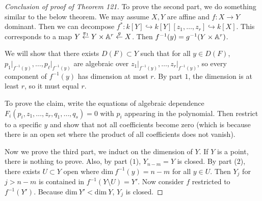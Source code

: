 \documentclass[twoside, 10pt]{article}
\begin{document}
    \begin{proof}[Conclusion of proof of Theorem 121] To prove the second part,
        we do something similar to the below theorem.  We may assume $X,Y$ are
        affine and $f:X \to Y$ dominant. Then we can decompose $f^*:k[Y]
        \hookrightarrow k[Y][z_1, \ldots, z_r] \hookrightarrow k[X]$. This
        corresponds to a map $Y \overset{\pi_1}{\gets} Y \times \mathbb{A}^r
        \overset{g}{\gets} X$. Then $f^{-1}(y) = g^{-1}(Y \times \mathbb{A}^r)$.

        We will show that there exists $D(F) \subset Y$ such that for all $y
        \in D(F)$, $p_1\vert_{f^{-1}(y)}, \ldots, p_{\ell}\vert_{f^{-1}(y)}$
        are algebraic over $z_1\vert_{f^{-1}(y)}, \ldots,
        z_r\vert_{f^{-1}(y)}$, so every component of $f^{-1}(y)$ has dimension
        at most $r$. By part $1$, the dimension is at least $r$, so it must
        equal $r$.

        To prove the claim, write the equations of algebraic dependence
        $F_i(p_i, z_1, \ldots, z_r, q_1, \ldots, q_s) = 0$ with $p_i$ appearing
        in the polynomial. Then restrict to a specific $y$ and show that not
        all coefficients become zero (which is because there is an open set
        where the product of all coefficients does not vanish).

        Now we prove the third part, we induct on the dimension of $Y$. If $Y$
        is a point, there is nothing to prove. Also, by part ($1$), $Y_{n-m} =
        Y$ is closed. By part ($2$), there exists $U \subset Y$ open where
        $\mathrm{dim}\ f^{-1}(y) = n-m$ for all $y \in U$. Then $Y_j$ for $j >
    n-m$ is contained in $f^{-1}(Y \setminus U) = Y'$. Now consider $f$
restricted to $f^{-1}(Y')$. Because $\mathrm{dim}\ Y' < \mathrm{dim}\ Y$, $Y_j$
is closed.  \end{proof}
\end{document}
